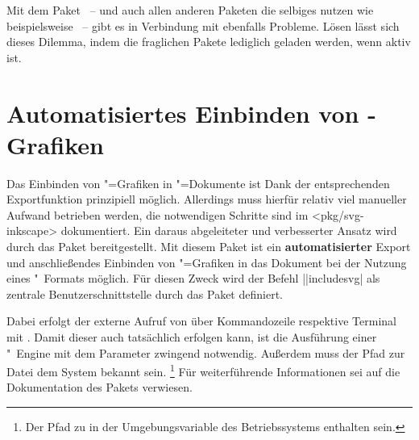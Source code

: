 %
Mit dem Paket ~-- und auch allen anderen Paketen die 
selbiges nutzen wie beispielsweise ~-- gibt es in Verbindung 
mit  ebenfalls Probleme. Lösen lässt sich dieses Dilemma, 
indem die fraglichen Pakete lediglich geladen werden, wenn  
aktiv ist.
%
\begin{quoting}[rightmargin=0pt]
\begin{Code}
\ifpdf
  \usepackage{tikz}%
\fi
\end{Code}
\end{quoting}



\section{%
  Automatisiertes Einbinden von -Grafiken%
  \label{sec:tips:svg}%
}
%
%
Das Einbinden von "=Grafiken in "=Dokumente
ist Dank der entsprechenden Exportfunktion prinzipiell möglich. Allerdings muss 
hierfür relativ viel manueller Aufwand betrieben werden, die notwendigen 
Schritte sind im \CTAN<pkg/svg-inkscape> dokumentiert. Ein daraus 
abgeleiteter und verbesserter Ansatz wird durch das Paket  
bereitgestellt. Mit diesem Paket ist ein \textbf{automatisierter} Export und 
anschließendes Einbinden von "=Grafiken in das Dokument 
bei der Nutzung eines "~Formats möglich. Für diesen Zweck wird 
der Befehl \Macro||{includesvg|} als 
zentrale Benutzerschnittstelle durch das Paket definiert.

Dabei erfolgt der externe Aufruf von  über Kommandozeile 
respektive Terminal mit . Damit dieser auch tatsächlich 
erfolgen kann, ist die Ausführung einer "~Engine mit dem 
Parameter  zwingend notwendig. Außerdem muss der 
Pfad zur Datei  dem System bekannt sein.%
\footnote{%
  Der Pfad zu  in der Umgebungsvariable  des 
  Betriebssystems enthalten sein.%
}
Für weiterführende Informationen sei auf die Dokumentation des Pakets 
 verwiesen.



